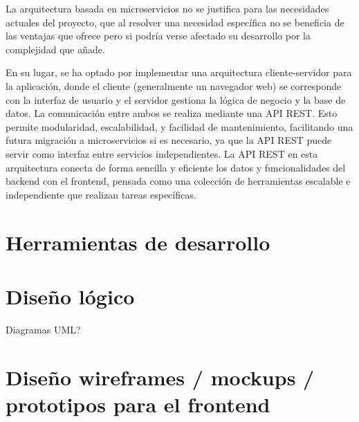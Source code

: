La arquitectura basada en microservicios no se justifica para las necesidades actuales del proyecto, que al resolver una necesidad específica no se beneficia de las ventajas que ofrece pero si podría verse afectado su desarrollo por la complejidad que añade. 

En su lugar, se ha optado por implementar una arquitectura cliente-servidor para la aplicación, donde el cliente (generalmente un navegador web) se corresponde con la interfaz de usuario y el servidor gestiona la lógica de negocio y la base de datos. La comunicación entre ambos se realiza mediante una API REST. Esto permite modularidad, escalabilidad, y facilidad de mantenimiento, facilitando una futura migración a microservicios si es necesario, ya que la API REST puede servir como interfaz entre servicios independientes. La API REST en esta arquitectura conecta de forma sencilla y eficiente los datos y funcionalidades del backend con el frontend, pensada como una colección de herramientas escalable e independiente que realizan tareas específicas. 

\section{Herramientas de desarrollo}

\section{Diseño lógico}
Diagramas UML?

\section{Diseño wireframes / mockups / prototipos para el frontend}